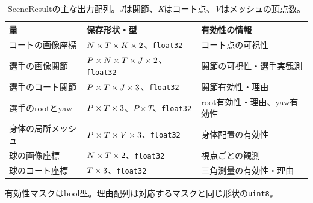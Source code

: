 \begin{table}[htbp]
\centering
\caption{SceneResultの主な出力配列。\textit{J}は関節、\textit{K}はコート点、\textit{V}はメッシュの頂点数。}
\label{tab:scene-contract}
\small
\begin{tabular}{@{}lll@{}}
\toprule
量 & 保存形状・型 & 有効性の情報 \\
\midrule
コートの画像座標 & $N\times T\times K\times\ev{schema}{2}$、\texttt{float32} & コート点の可視性 \\
選手の画像関節 & $P\times N\times T\times J\times\ev{schema}{2}$、\texttt{float32} & 関節の可視性・選手実観測 \\
選手のコート関節 & $P\times T\times J\times\ev{schema}{3}$、\texttt{float32} & 関節有効性・理由 \\
選手のrootとyaw & $P\times T\times\ev{schema}{3}$、$P\times T$、\texttt{float32} & root有効性・理由、yaw有効性 \\
身体の局所メッシュ & $P\times T\times V\times\ev{schema}{3}$、\texttt{float32} & 身体配置の有効性 \\
球の画像座標 & $N\times T\times\ev{schema}{2}$、\texttt{float32} & 視点ごとの観測 \\
球のコート座標 & $T\times\ev{schema}{3}$、\texttt{float32} & 三角測量の有効性・理由 \\
\bottomrule
\end{tabular}

\smallskip
{\footnotesize 有効性マスクはbool型。理由配列は対応するマスクと同じ形状の\texttt{uint8}。}
\end{table}
